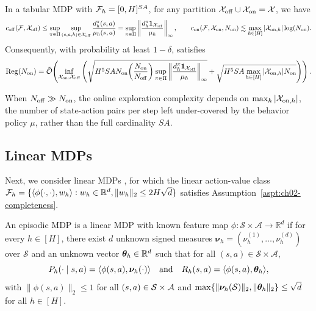 \begin{prop}
\label{prop:ch02-case_tabular}
In a tabular MDP with ${\mathcal{F}}_h = [0, H]^{S A}$, for any partition ${\mathcal{X}}_{{\operatorname{off}}} \cup {\mathcal{X}}_{{\operatorname{on}}} = {\mathcal{X}}$, we have
\begin{equation}
    c_{{\operatorname{off}}}({\mathcal{F}}, {\mathcal{X}}_{{\operatorname{off}}}) \leq \sup_{\pi \in \Pi} \sup_{(s, a, h) \in {\mathcal{X}}_{{\operatorname{off}}}} \frac{d_h^{\pi}(s, a)}{\mu_h(s, a)} = \sup_{\pi \in \Pi}\left\lVert\frac{d_h^{\pi}\mathbf{1}_{{\mathcal{X}}_{{\operatorname{off}}}}}{\mu_h}\right\rVert_{\infty}, \qquad
    c_{{\operatorname{on}}}({\mathcal{F}}, {\mathcal{X}}_{{\operatorname{on}}}, N_{{\operatorname{on}}}) \lesssim \max_{h \in [H]}|{\mathcal{X}}_{{\operatorname{on}}, h}| \log(N_{{\operatorname{on}}}).
\end{equation}
Consequently, with probability at least $1-\delta$,  satisfies
\begin{equation}
    \operatorname{Reg}(N_{{\operatorname{on}}})
    = \tilde{{\mathcal{O}}}\!\left(\inf_{{\mathcal{X}}_{{\operatorname{on}}}, {\mathcal{X}}_{{\operatorname{off}}}} \left(\sqrt{H^5 S A N_{{\operatorname{on}}}\!\left(\frac{N_{{\operatorname{on}}}}{N_{{\operatorname{off}}}}\right)\sup_{\pi \in \Pi}\left\lVert\frac{d_h^{\pi}\mathbf{1}_{{\mathcal{X}}_{{\operatorname{off}}}}}{\mu_h}\right\rVert_{\infty}}  + \sqrt{H^5 S A\max_{h \in [H]}|{\mathcal{X}}_{{\operatorname{on}}, h}|N_{{\operatorname{on}}}}\right)\right).
\end{equation}
\end{prop}

When $N_{{\operatorname{off}}} \gg N_{{\operatorname{on}}}$, the online exploration complexity depends on $\max_h |{\mathcal{X}}_{{\operatorname{on}}, h}|$, the number of state-action pairs per step left under-covered by the behavior policy $\mu$, rather than the full cardinality $S A$.

\subsection{Linear MDPs}
Next, we consider linear MDPs \citep{yang2019sampleoptimal, jin2020provably}, for which the linear action-value class ${\mathcal{F}}_h = \{\langle \phi(\cdot, \cdot), w_h\rangle : w_h \in {\mathbb{R}}^d, \|w_h\|_2 \leq 2H\sqrt{d}\}$ satisfies Assumption~\ref{aspt:ch02-completeness}.

\begin{defn}
\label{defn:ch02-linear_MDP}
An episodic MDP is a linear MDP with known feature map $\phi: \mathcal{S} \times \mathcal{A} \rightarrow \mathbb{R}^d$ if for every $h \in [H]$, there exist $d$ unknown signed measures $\boldsymbol{\nu}_h = (\nu_h^{(1)}, \ldots, \nu_h^{(d)})$ over $\mathcal{S}$ and an unknown vector ${\bm{\theta}}_h \in \mathbb{R}^d$ such that for all $(s, a) \in \mathcal{S} \times \mathcal{A}$,
\begin{equation}
    P_h(\cdot \mid s, a) = \langle \phi(s, a), \boldsymbol{\nu}_h(\cdot)\rangle \quad \text{and} \quad R_h(s, a) = \langle \phi(s, a), {\bm{\theta}}_h\rangle,
\end{equation}
with $\|\phi(s, a)\|_2 \leq 1$ for all $(s, a) \in {\mathcal{S}} \times {\mathcal{A}}$ and $\max\{\|\boldsymbol{\nu}_h({\mathcal{S}})\|_2, \|{\bm{\theta}}_h\|_2\} \leq \sqrt{d}$ for all $h \in [H]$.
\end{defn}


